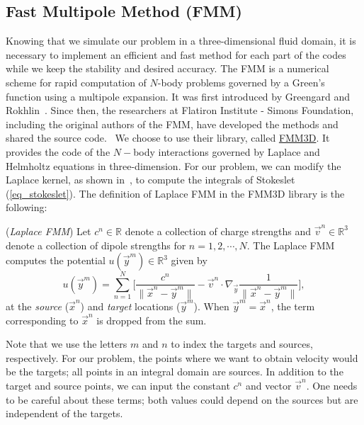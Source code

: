\subsection{Fast Multipole Method (FMM)}
\label{subsec:FMM}
Knowing that we simulate our problem in a three-dimensional fluid domain, it is necessary to implement an efficient and fast method for each part of the codes while we keep the stability and desired accuracy. 
The FMM is a numerical scheme for rapid computation of $N$-body problems governed by a Green's function using a multipole expansion. It was first introduced by Greengard and Rokhlin~\cite{greengard_fast_1987}. Since then, the researchers at Flatiron Institute - Simons Foundation,  including the original authors of the FMM, have developed the methods and shared the source code.~\cite{cheng_fast_1999,greengard_new_1997,greengard_new_2002} We choose to use their library, called \href{https://github.com/flatironinstitute/FMM3D}{{\color{blue}FMM3D}}. It provides the code of the $N-$body interactions governed by Laplace and Helmholtz equations in three-dimension.
For our problem, we can modify the Laplace kernel, as shown in~\cite{tornberg_fast_2008}, to compute the integrals of Stokeslet (\ref{eq_stokeslet}).
The definition of Laplace FMM in the FMM3D library is the following:
\begin{definition} (\textit{Laplace FMM})
	\label{eq_def_FMM}
	Let $c^n \in \mathbb{R}$ denote a collection of charge strengths and $\vec{v}^n \in \mathbb{R}^3$ denote a collection of dipole strengths for $n = 1,2, \cdots, N$.
	The Laplace FMM computes the potential $u(\vec{y}^m) \in \mathbb{R}^3$ given by
\begin{equation}
	u(\vec{y}^m) = \sum_{n = 1}^{N} 
		\Biggl[
		\frac{c^n}{\|\vec{x}^n - \vec{y}^m \|}
			- \vec{v}^n \cdot \nabla_{\vec{y}} 
			 \frac{1}{\|\vec{x}^n - \vec{y}^m \|}
		\Biggr],
\label{eq_fmm3d_package}
\end{equation}
	at the \textit{source} ($\vec{x}^n$) and \textit{target} locations ($\vec{y}^m$). 
	When $\vec{y}^m = \vec{x}^n$, the term corresponding to $\vec{x}^n$
	is dropped from the sum.
\end{definition}
\noindent
Note that we use the letters $m$ and $n$ to index the targets and sources, respectively. For our problem, the points where we want to obtain velocity would be the targets; all points in an integral domain are sources.
In addition to the target and source points, we can input the constant $c^n$ and vector $\vec{v}^{n}$. One needs to be careful about these terms; both values could depend on the sources but are independent of the targets. 
